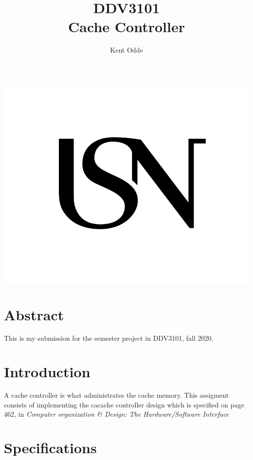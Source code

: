 \documentclass{article}
\begin{document}
\author{Kent Odde}
\title{DDV3101 \\Cache Controller}

\maketitle
\thispagestyle{empty}
\begin{center}
\includegraphics[width=\linewidth,height=0.2\textheight,keepaspectratio]{img/USN.png}
\end{center}
\newpage

\tableofcontents

\newpage

\section{Abstract}

This is my submission for the semester project in DDV3101, fall 2020.

\section{Introduction}
A cache controller is what administrates the cache memory. This assigment consists of implementing the cacache controller design which is specified on page 462, in \textit{Computer organization \& Design: The Hardware/Software Interface}\cite{BOOK}

\section{Specifications}
\end{document}
